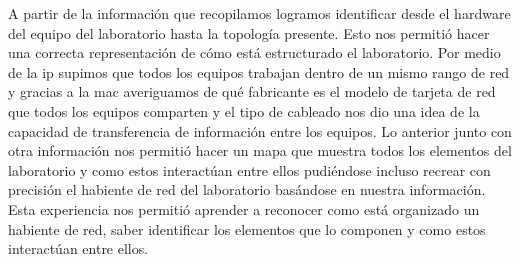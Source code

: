 \documentclass[spanish]{udpreport}
\begin{document}
A partir de la información que recopilamos logramos identificar desde el hardware del equipo del laboratorio hasta la topología presente. Esto nos permitió hacer una correcta representación de cómo está estructurado el laboratorio. Por medio de la ip supimos que todos los equipos trabajan dentro de un mismo rango de red y gracias a la mac averiguamos de qué fabricante es el modelo de tarjeta de red que todos los equipos comparten y el tipo de cableado nos dio una idea de la capacidad de transferencia de información entre los equipos. Lo anterior junto con otra información nos permitió hacer un mapa que muestra todos los elementos del laboratorio y como estos interactúan entre ellos pudiéndose incluso recrear con precisión el habiente de red del laboratorio basándose en nuestra información. Esta experiencia nos permitió aprender a reconocer como está organizado un habiente de red, saber identificar los elementos que lo componen y como estos interactúan entre ellos.
\end{document}
